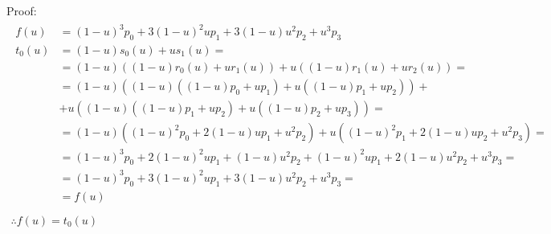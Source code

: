 \documentclass{article}
\begin{document}
	Proof:
	\begin{gather*}
		\begin{align*}
			f(u) &= (1-u)^3p_0  +  3(1-u)^2up_1 + 3(1-u)u^2p_2  +  u^3p_3 \\
			t_0(u) &= (1 - u)s_0(u) + us_1(u) =\\
			&= (1 - u)((1 - u)r_0(u) + ur_1(u)) + u((1 - u)r_1(u) + ur_2(u)) = \\
			&= (1 - u)((1 - u)((1 - u)p_0 + up_1) + u((1 - u)p_1 + up_2)) +\\
			&+ u((1 - u)((1 - u)p_1 + up_2) + u((1 - u)p_2 + up_3)) = \\
			&= (1 - u)((1 - u)^2p_0 + 2(1 - u)up_1 + u^2p_2) + u((1 - u)^2p_1 + 2(1 - u)up_2 + u^2p_3) = \\
			&= (1 - u)^3p_0 + 2(1 - u)^2up_1 + (1 - u)u^2p_2 + (1 - u)^2up_1 + 2(1-u)u^2p_2 +  u^3p_3 = \\
			&= (1 - u)^3p_0 + 3(1 - u)^2up_1 + 3 (1 - u)u^2p_2 + u^3p_3 =\\
			&= f(u) \\
		\end{align*} \\
		\therefore f(u) = t_0(u) \\
	\end{gather*}
\end{document}
